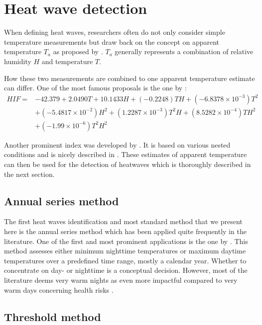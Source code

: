 \documentclass[12pt]{article}
\begin{document}
\section{Heat wave detection}

When defining heat waves, researchers often do not only consider simple temperature measurements but draw back on the concept on apparent temperature $T_a$ as proposed by \citet{steadman1984}. $T_a$ generally represents a combination of relative humidity $H$ and temperature $T$.

How these two measurements are combined to one apparent temperature estimate can differ. One of the most famous proposals is the one by \citet{el2007}:
\begin{equation}
\begin{aligned}
HIF = & -42.379 + 2.0490T + 10.1433H + (-0.2248)TH + (-6.8378 \times 10^{-3})T^2 \\
& + (-5.4817 \times 10^{-2})H^2 + (1.2287 \times 10^{-3})T^2H + (8.5282 \times 10^{-4})TH^2 \\
& + (-1.99 \times 10^{-6})T^2H^2
\end{aligned}
\end{equation}

Another prominent index was developed by \citet{nws2011}. It is based on various nested conditions and is nicely described in \citet{anderson2013}. These estimates of apparent temperature can then be used for the detection of heatwaves which is thoroughly described in the next section.

\subsection{Annual series method}

The first heat waves identification and most standard method that we present here is the annual series method which has been applied quite frequently in the literature. One of the first and most prominent applications is the one by \citet{karl1997}. This method assesses either minimum nighttime temperatures or maximum daytime temperatures over a predefined time range, mostly a calendar year. Whether to concentrate on day- or nighttime is a conceptual decision. However, most of the literature deems very warm nights as even more impactful compared to very warm days concerning health risks \citep{mcmichael1996,henschel1969}. 

\subsection{Threshold method}
\end{document}
